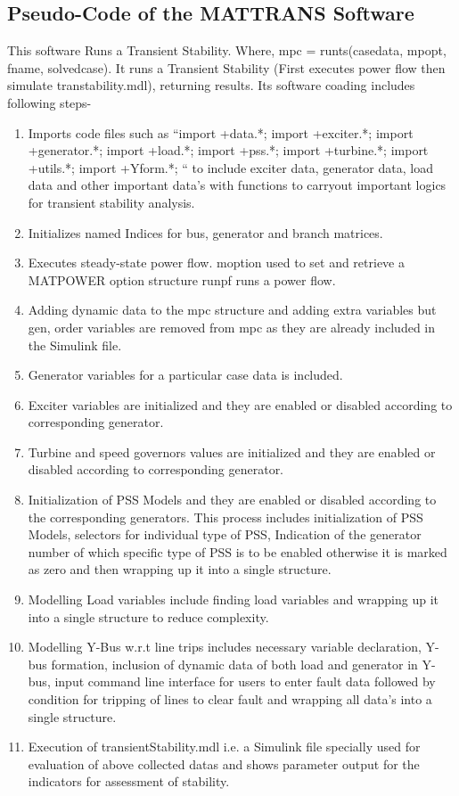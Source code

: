 \subsection{Pseudo-Code of the MATTRANS Software}
This software Runs a Transient Stability. Where, mpc = 
runts(casedata, mpopt, fname, solvedcase). It runs a 
Transient Stability (First executes power flow then simulate transtability.mdl), returning results. Its software coading includes following steps-
\begin{enumerate}
\item Imports code files such as “import +data.*; import +exciter.*; import +generator.*; import +load.*; import +pss.*; import +turbine.*; import +utils.*; import +Yform.*; “ to include exciter data, generator data, load data and other important data’s with functions to carryout important logics for transient stability analysis.
\item Initializes named Indices for bus, generator and branch matrices.
\item	Executes steady-state power flow. moption used to set and retrieve a MATPOWER option structure runpf runs a power flow.
\item	Adding dynamic data to the mpc structure and adding extra variables but gen, order variables are removed from mpc as they are already included in the Simulink file.
\item	Generator variables for a particular case data is included.
\item	Exciter variables are initialized and they are enabled or disabled according to corresponding generator.
\item	Turbine and speed governors values are initialized and they are enabled or disabled according to corresponding generator.
\item	Initialization of PSS Models and they are enabled or disabled according to the corresponding generators. This process includes initialization of PSS Models, selectors for individual type of PSS, Indication of the generator number of which specific type of PSS is to be enabled otherwise it is marked as zero and then wrapping up it into a single structure.
\item	Modelling Load variables include finding load variables and wrapping up it into a single structure to reduce complexity.
\item	Modelling Y-Bus w.r.t line trips includes necessary variable declaration, Y-bus formation, inclusion of dynamic data of both load and generator in Y-bus, input command line interface for users to enter fault data followed by condition for tripping of lines to clear fault and wrapping all data’s into a single structure.
\item	Execution of transientStability.mdl i.e. a Simulink file specially used for evaluation of above collected datas and shows parameter output for the indicators for assessment of stability.
\end{enumerate}

